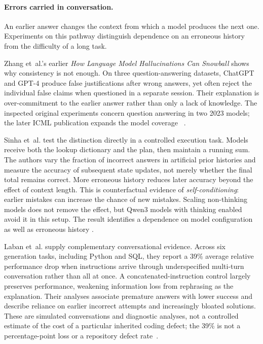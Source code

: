 \paragraph{Errors carried in conversation.}
An earlier answer changes the context from which a model produces the next
one. Experiments on this pathway distinguish dependence on an erroneous
history from the difficulty of a long task.

Zhang et~al.'s earlier \emph{How Language Model Hallucinations Can Snowball}
shows why consistency is not enough. On three question-answering datasets,
ChatGPT and GPT-4 produce false justifications after wrong answers, yet often
reject the individual false claims when questioned in a separate session.
Their explanation is over-commitment to the earlier answer rather than only
a lack of knowledge. The inspected original experiments concern question answering in two
2023 models; the later ICML publication expands the model coverage
~\cite[original preprint, Secs.~3.1--3.4]{zhang2023snowball}.

Sinha et~al. test the distinction directly in a controlled execution task.
Models receive both the lookup dictionary and the plan, then maintain a
running sum. The authors vary the fraction of incorrect answers in artificial
prior histories and measure the accuracy of subsequent state updates, not
merely whether the final total remains correct. More erroneous history reduces
later accuracy beyond the effect of context length. This is counterfactual
evidence of \emph{self-conditioning}: earlier mistakes can increase the chance
of new mistakes. Scaling non-thinking models does not remove the effect, but
Qwen3 models with thinking enabled avoid it in this setup. The result identifies
a dependence on model configuration as well as erroneous history
\cite[Secs.~2.2--3, Figs.~5--6]{sinha2025illusion}.

Laban et~al. supply complementary conversational evidence. Across six
generation tasks, including Python and SQL, they report a 39\% average relative
performance drop when instructions arrive through underspecified multi-turn
conversation rather than all at once. A concatenated-instruction control
largely preserves performance, weakening information loss from rephrasing as
the explanation. Their analyses associate premature answers with lower success
and describe reliance on earlier incorrect attempts and increasingly bloated
solutions. These are simulated conversations and diagnostic analyses, not a
controlled estimate of the cost of a particular inherited coding defect; the
39\% is not a percentage-point loss or a repository defect
rate~\cite[arXiv v1, Secs.~3.3 and~6.1, App.~F.1--F.2]{laban2025lost}.

